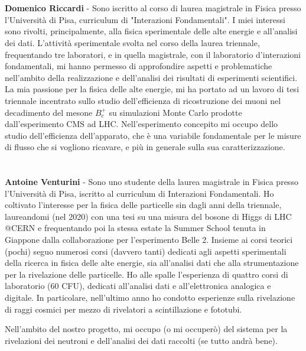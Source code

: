 \documentclass{article}
\begin{document}
\section*{}
\textbf{Domenico Riccardi} - Sono iscritto al corso di laurea magistrale in Fisica presso l'Università di Pisa, curriculum di "Interazioni Fondamentali". I miei interessi sono rivolti, principalmente, alla fisica sperimentale delle alte energie e all'analisi dei dati. L'attività sperimentale svolta nel corso della laurea triennale, frequentando tre laboratori, e in quella magistrale, con il laboratorio d'interazioni fondamentali, mi hanno permesso di approfondire aspetti e problematiche nell'ambito della realizzazione e dell'analisi dei risultati di esperimenti scientifici. La mia passione per la fisica delle alte energie, mi ha portato ad un lavoro di tesi triennale incentrato sullo studio dell'efficienza di ricostruzione dei muoni nel decadimento del mesone $B_c^+$ su simulazioni Monte Carlo prodotte dall'esperimento CMS ad LHC. Nell'esperimento concepito mi occupo dello studio dell'efficienza dell'apparato, che è una variabile fondamentale per le misure di flusso che si vogliono ricavare, e più in generale sulla sua caratterizzazione.

\section*{}
\textbf{Antoine Venturini} - Sono uno studente della laurea magistrale in Fisica presso l'Università di Pisa, iscritto al curriculum di Interazioni Fondamentali. Ho coltivato l'interesse per la fisica delle particelle sin dagli anni della triennale, laureandomi (nel 2020) con una tesi su una misura del bosone di Higgs di LHC @CERN e frequentando poi la stessa estate la Summer School tenuta in Giappone dalla collaborazione per l'esperimento Belle 2.  
Insieme ai corsi teorici (pochi) seguo numerosi corsi (davvero tanti) dedicati agli aspetti sperimentali della ricerca in fisica delle alte energie, sia all'analisi dati che alla strumentazione per la rivelazione delle particelle.
Ho alle spalle l'esperienza di quattro corsi di laboratorio (60 CFU), dedicati all'analisi dati e all'elettronica analogica e digitale. In particolare, nell'ultimo anno ho condotto esperienze sulla rivelazione di raggi cosmici per mezzo di rivelatori a scintillazione e fototubi. 

Nell'ambito del nostro progetto, mi occupo (o mi occuperò) del sistema per la rivelazioni dei neutroni e dell'analisi dei dati raccolti (se tutto andrà bene). 
\end{document}
